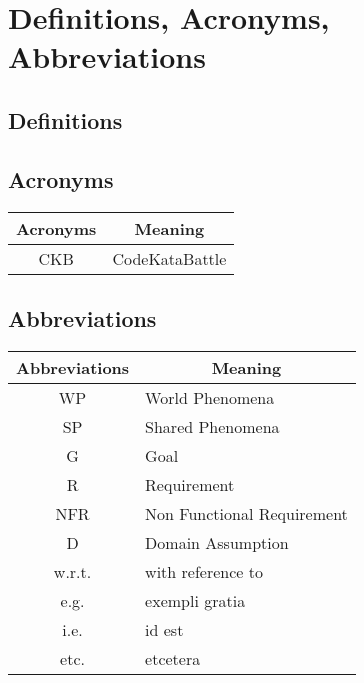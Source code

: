 \section{Definitions, Acronyms, Abbreviations}
\subsection{Definitions}

\subsection{Acronyms}

\begin{table}[H]
    \centering
    \begin{tabular}{|c|l|}
    \hline
    \rowcolor[HTML]{B8C8D5} 
    \textbf{Acronyms} & \multicolumn{1}{c|}{\cellcolor[HTML]{B8C8D5}\textbf{Meaning}} \\ \hline
    CKB & CodeKataBattle  \\ \hline
    \end{tabular}
\end{table}

\subsection{Abbreviations}

\begin{table}[H]
    \centering
    \begin{tabular}{|c|l|}
    \hline
    \rowcolor[HTML]{B8C8D5} 
    \textbf{Abbreviations} & \multicolumn{1}{c|}{\cellcolor[HTML]{B8C8D5}\textbf{Meaning}} \\ \hline
    WP & World Phenomena  \\ \hline
    SP & Shared Phenomena \\ \hline
    G  & Goal             \\ \hline
    R  & Requirement             \\ \hline
    NFR  & Non Functional Requirement             \\ \hline
    D  & Domain Assumption             \\ \hline
    w.r.t. & with reference to \\ \hline
    e.g. & exempli gratia \\ \hline
    i.e. & id est \\ \hline
    etc. & etcetera \\ \hline
    \end{tabular}
\end{table}

